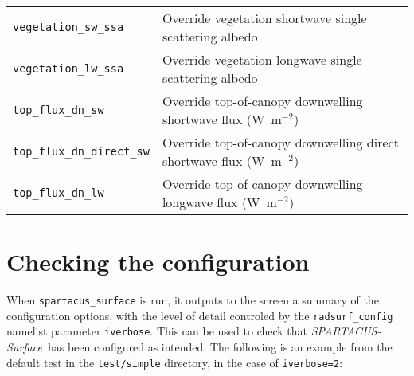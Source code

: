 \documentclass[a4,oneside]{article}
\def\codesize{\small}
\def\codetabsize{\footnotesize}
\def\spsurf{\emph{SPARTACUS-Surface}}
\def\code#1{{\codesize\texttt{#1}}}
\def\codetab#1{{\codetabsize\texttt{#1}}}
\begin{document}
\begin{center}
\begin{longtable}{ll}
\codetab{vegetation\_sw\_ssa} & Override vegetation shortwave single scattering albedo \\
\codetab{vegetation\_lw\_ssa} & Override vegetation longwave single scattering albedo \\
\codetab{top\_flux\_dn\_sw} & Override top-of-canopy downwelling shortwave flux (W~m$^{-2}$)\\
\codetab{top\_flux\_dn\_direct\_sw} & Override top-of-canopy downwelling direct shortwave flux (W~m$^{-2}$)\\
\codetab{top\_flux\_dn\_lw} & Override top-of-canopy downwelling longwave flux (W~m$^{-2}$)\\
\hline
\end{longtable}
\end{center}

\section{Checking the configuration}
\label{sec:checking}
When \code{spartacus\_surface} is run, it outputs to the screen a
summary of the configuration options, with the level of detail
controled by the \code{radsurf\_config} namelist parameter
\code{iverbose}. This can be used to check that \spsurf\ has been
configured as intended.  The following is an example from the default
test in the \code{test/simple} directory, in the case of
\code{iverbose=2}:
\end{document}
